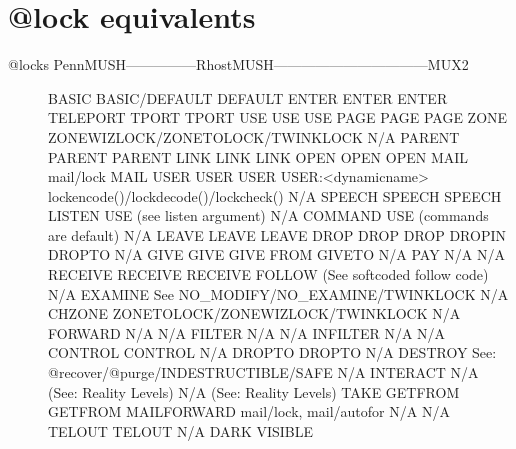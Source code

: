 \documentclass[letterpaper,10pt,english]{sphinxmanual}
\begin{document}
\section{@lock equivalents}
\label{\detokenize{differences:lock-equivalents}}\begin{description}
\item[{@locks PennMUSH—————RhostMUSH———————————\textendash{}MUX2}] \leavevmode
\sphinxAtStartPar
BASIC                  BASIC/DEFAULT                               DEFAULT
ENTER                  ENTER                                       ENTER
TELEPORT               TPORT                                       TPORT
USE                    USE                                         USE
PAGE                   PAGE                                        PAGE
ZONE                   ZONEWIZLOCK/ZONETOLOCK/TWINKLOCK            N/A
PARENT                 PARENT                                      PARENT
LINK                   LINK                                        LINK
OPEN                   OPEN                                        OPEN
MAIL                   mail/lock                                   MAIL
USER                   USER                                        USER
USER:\textless{}dynamicname\textgreater{}     lockencode()/lockdecode()/lockcheck()       N/A
SPEECH                 SPEECH                                      SPEECH
LISTEN                 USE (see listen argument)                   N/A
COMMAND                USE (commands are default)                  N/A
LEAVE                  LEAVE                                       LEAVE
DROP                   DROP                                        DROP
DROPIN                 DROPTO                                      N/A
GIVE                   GIVE                                        GIVE
FROM                   GIVETO                                      N/A
PAY                    N/A                                         N/A
RECEIVE                RECEIVE                                     RECEIVE
FOLLOW                 (See softcoded follow code)                 N/A
EXAMINE                See NO\_MODIFY/NO\_EXAMINE/TWINKLOCK          N/A
CHZONE                 ZONETOLOCK/ZONEWIZLOCK/TWINKLOCK            N/A
FORWARD                N/A                                         N/A
FILTER                 N/A                                         N/A
INFILTER               N/A                                         N/A
CONTROL                CONTROL                                     N/A
DROPTO                 DROPTO                                      N/A
DESTROY                See: @recover/@purge/INDESTRUCTIBLE/SAFE    N/A
INTERACT               N/A (See: Reality Levels)                   N/A (See: Reality Levels)
TAKE                   GETFROM                                     GETFROM
MAILFORWARD            mail/lock, mail/autofor                     N/A
N/A                    TELOUT                                      TELOUT
N/A                    DARK                                        VISIBLE

\end{description}
\end{document}
